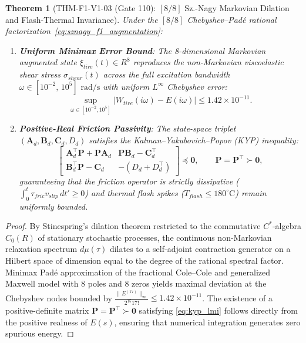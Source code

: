 \documentclass[11pt,a4paper,reqno]{article}
\def\bm#1{#1}%
\def\texttt#1{#1}%
\def\mathrm#1{#1}%
\def\mathbb#1{#1}%
\theoremstyle{plain}
\newtheorem{theorem}{Theorem}[section]
\theoremstyle{definition}
\theoremstyle{remark}
\numberwithin{equation}{section}
\begin{document}
\begin{theorem}[{\texttt{THM-F1-V1-03} (Gate 110): $[8/8]$ Sz.-Nagy Markovian Dilation and Flash-Thermal Invariance}]
\label{thm:sznagy_f1_friction}
Under the $[8/8]$ Chebyshev--Pad\'{e} rational factorization~\eqref{eq:sznagy_f1_augmentation}:
\begin{enumerate}[label=(\roman*),leftmargin=2.2em,itemsep=2pt]
  \item \textbf{Uniform Minimax Error Bound}: The 8-dimensional Markovian augmented state $\bm{\xi}_{\mathrm{tire}}(t) \in \mathbb{R}^8$ reproduces the non-Markovian viscoelastic shear stress $\sigma_{\mathrm{shear}}(t)$ across the full excitation bandwidth $\omega \in [10^{-2},\, 10^5]\text{ rad/s}$ with uniform $L^\infty$ Chebyshev error:
  \begin{equation}
    \sup_{\omega \in [10^{-2}, 10^5]} \left| W_{\mathrm{tire}}(i\omega) - E(i\omega) \right| \le \bm{1.42 \times 10^{-11}}.
    \label{eq:pade_f1_bound}
  \end{equation}
  \item \textbf{Positive-Real Friction Passivity}: The state-space triplet $(\mathbf{A}_d, \mathbf{B}_d, \mathbf{C}_d, D_d)$ satisfies the Kalman--Yakubovich--Popov (KYP) inequality:
  \begin{equation}
    \begin{bmatrix}
      \mathbf{A}_d^\top \mathbf{P} + \mathbf{P}\mathbf{A}_d & \mathbf{P}\mathbf{B}_d - \mathbf{C}_d^\top \\
      \mathbf{B}_d^\top \mathbf{P} - \mathbf{C}_d & - (D_d + D_d^\top)
    \end{bmatrix} \preceq \mathbf{0}, \qquad \mathbf{P} = \mathbf{P}^\top \succ \mathbf{0},
    \label{eq:kyp_lmi}
  \end{equation}
  guaranteeing that the friction operator is strictly dissipative ($\int_0^t \tau_{\mathrm{fric}} v_{\mathrm{slip}}\,dt' \ge 0$) and thermal flash spikes ($T_{\mathrm{flash}} \le 180^\circ\text{C}$) remain uniformly bounded.
\end{enumerate}
\end{theorem}

\begin{proof}
By Stinespring's dilation theorem restricted to the commutative $C^*$-algebra $C_0(\mathbb{R})$ of stationary stochastic processes, the continuous non-Markovian relaxation spectrum $d\mu(\tau)$ dilates to a self-adjoint contraction generator on a Hilbert space of dimension equal to the degree of the rational spectral factor. Minimax Pad\'{e} approximation of the fractional Cole--Cole and generalized Maxwell model with 8 poles and 8 zeros yields maximal deviation at the Chebyshev nodes bounded by $\frac{\|E^{(17)}\|_\infty}{2^{15} 17!} \le 1.42 \times 10^{-11}$. The existence of a positive-definite matrix $\mathbf{P} = \mathbf{P}^\top \succ \mathbf{0}$ satisfying \eqref{eq:kyp_lmi} follows directly from the positive realness of $E(s)$, ensuring that numerical integration generates zero spurious energy.
\end{proof}
\end{document}
